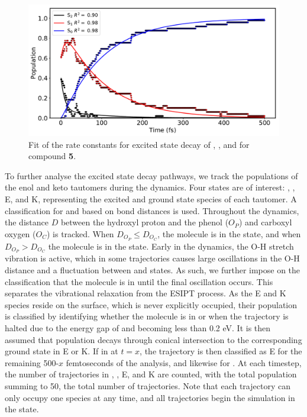 \begin{figure}[t]
\centering
  \includegraphics[width=0.9\linewidth]{3nonradiativedecay/HC_5_states_dynamics_fit.pdf}
  \caption[Model of the state decay rates for \textbf{HC5}]{Fit of the rate constants for excited state decay of \stwo{}, \sone{}, and \szero{} for compound \textbf{5}.}
  \label{figure: HC_5_states_dynamics_fit}
\end{figure}

To further analyse the excited state decay pathways, we track the populations of the enol and keto tautomers during the dynamics. Four states are of interest: \Estar{}, \Kstar{}, E, and K, representing the excited and ground state species of each tautomer. A classification for \Estar{} and \Kstar{} based on bond distances is used. Throughout the dynamics, the distance $D$ between the hydroxyl proton and the phenol ($O_{P}$) and carboxyl oxygen ($O_{C}$) is tracked.  When $D_{O_{P}} \leq D_{O_{C}}$, the molecule is in the \Estar{} state, and when $D_{O_{P}} > D_{O_{C}}$ the molecule is in the \Kstar{} state. Early in the dynamics, the O-H stretch vibration is active, which in some trajectories causes large oscillations in the O-H distance and a fluctuation between \Estar{} and \Kstar{} states. As such, we further impose on the classification that the molecule is in \Estar{} until the final oscillation occurs. This separates the vibrational relaxation from the ESIPT process. As the E and K species reside on the \szero{} surface, which is never explicitly occupied, their population is classified by identifying whether the molecule is in \Estar{} or \Kstar{} when the trajectory is halted due to the energy gap of \sone{} and \szero{} becoming less than 0.2 eV. It is then assumed that population decays through conical intersection to the corresponding ground state in E or K. If in \Estar{} at $t=x$, the trajectory is then classified as E for the remaining 500-$x$ femtoseconds of the analysis, and likewise for  \Kstar{}. At each timestep, the number of trajectories in \Estar{}, \Kstar{}, E, and K are counted, with the total population summing to 50, the total number of trajectories. Note that each trajectory can only occupy one species at any time, and all trajectories begin the simulation in the \Estar{} state.

